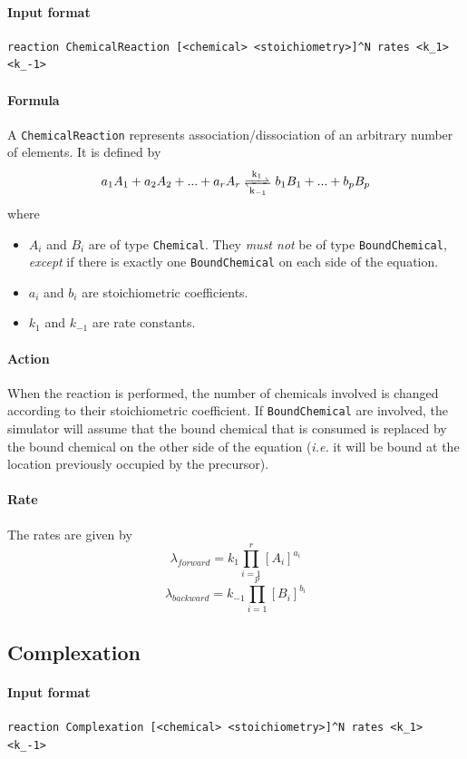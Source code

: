 \documentclass[12pt]{article}
\theoremstyle{definition}
\theoremstyle{remark}
\numberwithin{equation}{section}
\newcommand{\reactionRev}[4]{#1 \ce{<=>[#3][#4]} #2}
\begin{document}
\paragraph{Input format}
\begin{verbatim}
reaction ChemicalReaction [<chemical> <stoichiometry>]^N rates <k_1> <k_-1>
\end{verbatim}

\paragraph{Formula} A \texttt{ChemicalReaction} represents association/dissociation of an arbitrary number of elements. It is defined by
$$
	\reactionRev{a_1 A_1 + a_2 A_2 + ... + a_r A_r}{b_1 B_1 + ... + b_p B_p}{k_1}{k_{-1}}
$$
where
\begin{itemize}
	\item $A_i$ and $B_i$ are of type \texttt{Chemical}. They \emph{must not} be of type \texttt{BoundChemical}, \emph{except} if there is exactly one \texttt{BoundChemical} on each side of the equation. 
	\item $a_i$ and $b_i$ are stoichiometric coefficients.
	\item $k_1$ and $k_{-1}$ are rate constants.
\end{itemize}

\paragraph{Action} When the reaction is performed, the number of chemicals involved is changed according to their stoichiometric coefficient. If \texttt{BoundChemical} are involved, the simulator will assume that the bound chemical that is consumed is replaced by the bound chemical on the other side of the equation (\textit{i.e.} it will be bound at the location previously occupied by the precursor).

\paragraph{Rate} The rates are given by
$$
	\lambda_{forward} = k_1 \prod\limits_{i=1}^{r} [A_i]^{a_i}
$$
$$
	\lambda_{backward} = k_{-1} \prod\limits_{i=1}^{p} [B_i]^{b_i}
$$

\subsection{Complexation}
\paragraph{Input format}
\begin{verbatim}
reaction Complexation [<chemical> <stoichiometry>]^N rates <k_1> <k_-1>
\end{verbatim}
\end{document}
